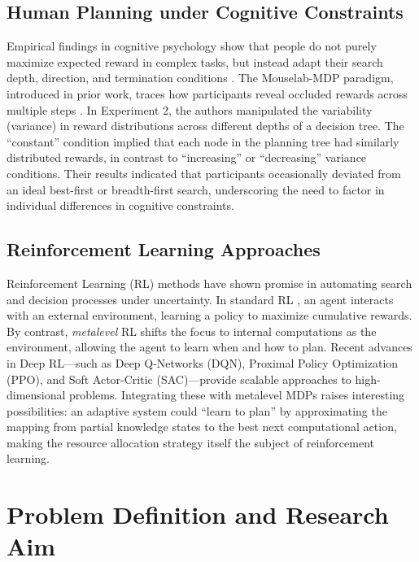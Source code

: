 \documentclass[a4paper,12pt,oneside,article]{memoir}
\begin{document}
\subsection*{Human Planning under Cognitive Constraints}
Empirical findings in cognitive psychology show that people do not purely maximize expected reward in complex tasks, but instead adapt their search depth, direction, and termination conditions \cite{payne1993adaptive}. The Mouselab-MDP paradigm, introduced in prior work, traces how participants reveal occluded rewards across multiple steps \cite{Callaway2023rationaluse}.  
In Experiment 2, the authors manipulated the variability (variance) in reward distributions across different depths of a decision tree. The “constant” condition implied that each node in the planning tree had similarly distributed rewards, in contrast to “increasing” or “decreasing” variance conditions. Their results indicated that participants occasionally deviated from an ideal best-first or breadth-first search, underscoring the need to factor in individual differences in cognitive constraints.

\subsection*{Reinforcement Learning Approaches}
Reinforcement Learning (RL) methods have shown promise in automating search and decision processes under uncertainty. In standard RL \cite{sutton2018reinforcement}, an agent interacts with an external environment, learning a policy to maximize cumulative rewards. By contrast, \emph{metalevel} RL shifts the focus to internal computations as the environment, allowing the agent to learn when and how to plan.  
Recent advances in Deep RL—such as Deep Q-Networks (DQN), Proximal Policy Optimization (PPO), and Soft Actor-Critic (SAC)—provide scalable approaches to high-dimensional problems. Integrating these with metalevel MDPs raises interesting possibilities: an adaptive system could “learn to plan” by approximating the mapping from partial knowledge states to the best next computational action, making the resource allocation strategy itself the subject of reinforcement learning.

\section*{Problem Definition and Research Aim}
\end{document}

